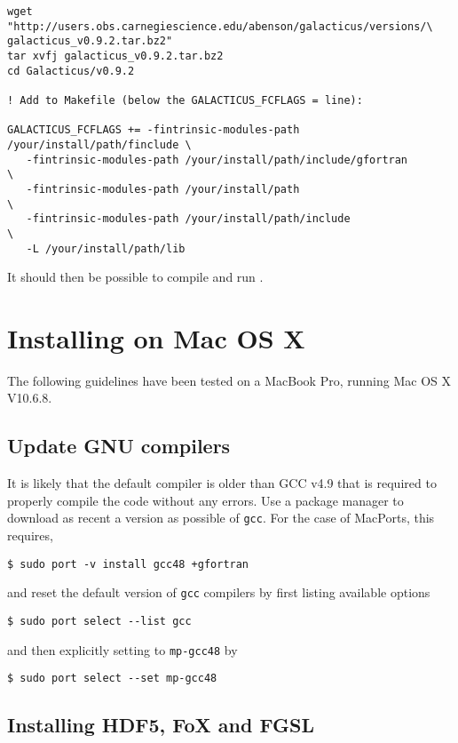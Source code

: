 \begin{lstlisting}[language=simple,stringstyle=\ttfamily,commentstyle=\itshape]
wget "http://users.obs.carnegiescience.edu/abenson/galacticus/versions/\
galacticus_v0.9.2.tar.bz2"
tar xvfj galacticus_v0.9.2.tar.bz2
cd Galacticus/v0.9.2

! Add to Makefile (below the GALACTICUS_FCFLAGS = line):

GALACTICUS_FCFLAGS += -fintrinsic-modules-path /your/install/path/finclude \
   -fintrinsic-modules-path /your/install/path/include/gfortran            \
   -fintrinsic-modules-path /your/install/path                             \
   -fintrinsic-modules-path /your/install/path/include                     \
   -L /your/install/path/lib
\end{lstlisting}

It should then be possible to compile and run \glc.

\section{Installing on Mac OS X}

The following guidelines have been tested on a MacBook Pro, running Mac OS X V10.6.8. 

\subsection{Update GNU compilers}

It is likely that the default compiler is older than GCC v4.9 that is required to properly compile the code without any errors. Use a package manager to download as recent a version as possible of {\tt gcc}. For the case of MacPorts, this requires,

\begin{verbatim}
$ sudo port -v install gcc48 +gfortran
\end{verbatim}

and reset the default version of {\tt gcc} compilers by first listing available options

\begin{verbatim}
$ sudo port select --list gcc
\end{verbatim}

and then explicitly setting to {\tt mp-gcc48} by

\begin{verbatim}
$ sudo port select --set mp-gcc48
\end{verbatim}

\subsection{Installing HDF5, FoX and FGSL}

